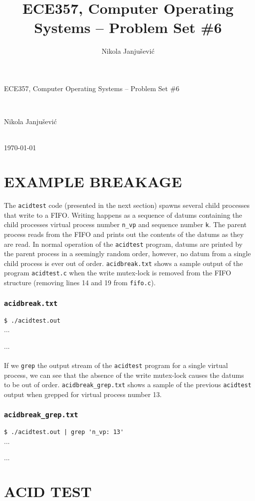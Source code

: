 \documentclass[11pt,a4paper]{article}
\author{Nikola Janju\v{s}evi\'{c}}
\title{ECE357, Computer Operating Systems -- Problem Set \#6}
\begin{document}
\begin{Large}
ECE357, Computer Operating Systems -- Problem Set \#6
\end{Large} \\
\begin{large}
Nikola Janju\v{s}evi\'{c}
\end{large} 
\\
\today

\section*{EXAMPLE BREAKAGE}
The \texttt{acidtest} code (presented in the next section) spawns several child processes that write to a FIFO. Writing happens as a sequence of datums containing the child processes virtual process number \verb!n_vp! and sequence number \verb!k!. The parent process reads from the FIFO and prints out the contents of the datums as they are read. In normal operation of the \verb!acidtest! program, datums are printed by the parent process in a seemingly random order, however, no datum from a single child process is ever out of order. \verb!acidbreak.txt! shows a sample output of the program \verb!acidtest.c! when the write mutex-lock is removed from the FIFO structure (removing lines 14 and 19 from \verb!fifo.c!).
\subsubsection*{\texttt{acidbreak.txt}}
\verb!$ ./acidtest.out! \\
...

... \\ \\
If we \verb!grep! the output stream of the \verb!acidtest! program for a single virtual process, we can see that the absence of the write mutex-lock causes the datums to be out of order. \verb!acidbreak_grep.txt! shows a sample of the previous \verb!acidtest! output when grepped for virtual process number 13.

\subsubsection*{\texttt{acidbreak\_grep.txt}}
\verb!$ ./acidtest.out | grep 'n_vp: 13'!\\
...

... \\

\section*{ACID TEST}
\end{document}
